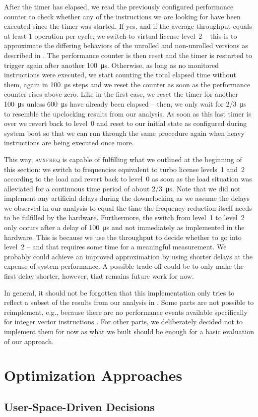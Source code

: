 After the timer has elapsed, we read the previously configured performance counter to check whether any of the instructions we are looking for have been executed since the timer was started. If yes, and if the average throughput equals at least $1$ operation per cycle, we switch to virtual license level~2 -- this is to approximate the differing behaviors of the unrolled and non-unrolled versions as described in . The performance counter is then reset and the timer is restarted to trigger again after another \SI{100}{\micro\second}. Otherwise, as long as no monitored instructions were executed, we start counting the total elapsed time without them, again in \SI{100}{\micro\second} steps and we reset the counter as soon as the performance counter rises above zero. Like in the first case, we reset the timer for another \SI{100}{\micro\second} unless \SI{600}{\micro\second} have already been elapsed -- then, we only wait for \SI[quotient-mode=fraction]{2/3}{\micro\second} to resemble the upclocking results from our analysis. As soon as this last timer is over we revert back to level~0 and reset to our initial state as configured during system boot so that we can run through the same procedure again when heavy instructions are being executed once more.

This way, \textsc{avxfreq} is capable of fulfilling what we outlined at the beginning of this section: we switch to frequencies equivalent to turbo license levels~1 and~2 according to the load and revert back to level~0 as soon as the load situation was alleviated for a continuous time period of about \SI[quotient-mode=fraction]{2/3}{\micro\second}. Note that we did not implement any artificial delays during the downclocking as we assume the delays we observed in our analysis to equal the time the frequency reduction itself needs to be fulfilled by the hardware. Furthermore, the switch from level~1 to level~2 only occurs after a delay of \SI{100}{\micro\second} and not immediately as implemented in the hardware. This is because we use the throughput to decide whether to go into level~2 -- and that requires some time for a meaningful measurement. We probably could achieve an improved approximation by using shorter delays at the expense of system performance. A possible trade-off could be to only make the first delay shorter, however, that remains future work for now.

In general, it should not be forgotten that this implementation only tries to reflect a subset of the results from our analysis in . Some parts are not possible to reimplement, e.g., because there are no performance events available specifically for integer vector instructions \cite{intelsdmsysprogguide}. For other parts, we deliberately decided not to implement them for now as what we built should be enough for a basic evaluation of our approach.


\section{Optimization Approaches}

\subsection{User-Space-Driven Decisions}
